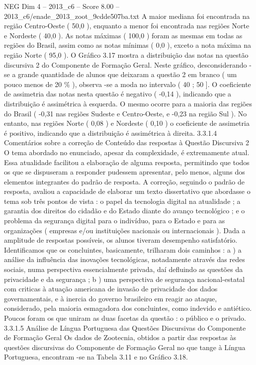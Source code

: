 \begin{textsample}{NEG Dim 4 – 2013\_c6 – Score 8.00 – 2013\_c6/enade\_2013\_zoot\_9cdde507ba.txt}
A maior mediana foi encontrada na região Centro-Oeste ( 50,0 ), enquanto a menor foi encontrada nas regiões Norte e Nordeste ( 40,0 ).
As notas máximas ( 100,0 ) foram as mesmas em todas as regiões do Brasil, assim como as notas mínimas ( 0,0 ), exceto a nota máxima na região Norte ( 95,0 ).
O Gráfico 3.17 mostra a distribuição das notas na questão discursiva 2 do Componente de Formação Geral.
Neste gráfico, desconsiderando -se a grande quantidade de alunos que deixaram a questão 2 em branco ( um pouco menos de 20 \% ), observa -se a moda no intervalo ( 40 ; 50 ].
O coeficiente de assimetria das notas nesta questão é negativo ( -0,14 ), indicando que a distribuição é assimétrica à esquerda.
O mesmo ocorre para a maioria das regiões do Brasil ( -0,31 nas regiões Sudeste e Centro-Oeste, e -0,23 na região Sul ).
No entanto, nas regiões Norte ( 0,08 ) e Nordeste ( 0,10 ) o coeficiente de assimetria é positivo, indicando que a distribuição é assimétrica à direita. 3.3.1.4 Comentários sobre a correção de Conteúdo das respostas à Questão Discursiva 2 O tema abordado no enunciado, apesar da complexidade, é extremamente atual.
Essa atualidade facilitou a elaboração de alguma resposta, permitindo que todos os que se dispuseram a responder pudessem apresentar, pelo menos, alguns dos elementos integrantes do padrão de resposta.
A correção, seguindo o padrão de resposta, avaliou a capacidade de elaborar um texto dissertativo que abordasse o tema sob três pontos de vista : o papel da tecnologia digital na atualidade ; a garantia dos direitos do cidadão e do Estado diante do avanço tecnológico ; e o problema da segurança digital para o indivíduo, para o Estado e para as organizações ( empresas e/ou instituições nacionais ou internacionais ).
Dada a amplitude de respostas possíveis, os alunos tiveram desempenho satisfatório.
Identificamos que os concluintes, basicamente, trilharam dois caminhos : a ) a análise da influência das inovações tecnológicas, notadamente através das redes sociais, numa perspectiva essencialmente privada, daí defluindo as questões da privacidade e da segurança ; b ) uma perspectiva de segurança nacional-estatal com criticas à atuação americana de invasão de privacidade dos dados governamentais, e à inercia do governo brasileiro em reagir ao ataque, considerado, pela maioria esmagadora dos concluintes, como indevido e antiético.
Poucos foram os que uniram as duas facetas da questão : o público e o privado. 3.3.1.5 Análise de Língua Portuguesa das Questões Discursivas do Componente de Formação Geral Os dados de Zootecnia, obtidos a partir das respostas às questões discursivas do Componente de Formação Geral no que tange à Língua Portuguesa, encontram -se na Tabela 3.11 e no Gráfico 3.18.

\end{textsample}
